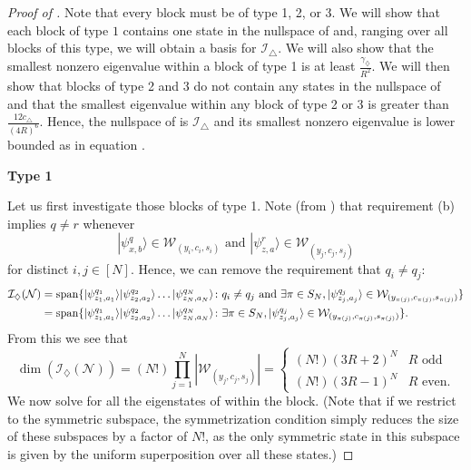 \documentclass[../thesis-main/thesis-main]{subfiles}
\begin{document}
\begin{proof}[Proof of \protect{}]
Note that every block must be of type 1, 2, or 3.  We will show that each block of type $1$ contains one state in the nullspace of  and, ranging over all blocks of this type, we will obtain a basis for $\mathcal{I}_{\triangle}$. We will also show that the smallest nonzero eigenvalue within a block of type 1 is at least $\frac{\gamma_{\diamondsuit}}{R^{2}}$.  We will then show that blocks of type 2 and 3 do not contain any states in the nullspace of  and that the smallest eigenvalue within any block of type 2 or 3 is greater than $\frac{12c_{\triangle}}{(4R)^6}$. Hence, the nullspace of  is $\mathcal{I}_{\triangle}$ and its smallest nonzero eigenvalue is lower bounded as in equation .

\smallskip
\noindent \textbf{Type 1}
\smallskip

\noindent Let us first investigate those blocks of type 1.  Note (from ) that requirement (b) implies $q\neq r$ whenever 
\begin{equation}
|\psi_{x,b}^{q}\rangle\in\mathcal{W}_{(y_{i},c_{i},s_{i})}\text{ and }|\psi_{z,a}^{r}\rangle\in\mathcal{W}_{(y_{j},c_{j},s_{j})}
\end{equation}
for distinct $i,j\in[N]$. Hence, we can remove the requirement that $q_i\neq q_j$:
\begin{align}
  \mathcal{\mathcal{I}_{\diamondsuit}}(\mathcal{N}) 
    & =\operatorname{span}\{ |\psi_{z_{1},a_{1}}^{q_{1}}\rangle|\psi_{z_{2},a_{2}}^{q_{2}}\rangle\ldots|\psi_{z_{N},a_{N}}^{q_{N}}\rangle\colon q_{i}\neq q_{j}\text{ and } \exists \pi \in S_N , |\psi_{z_{j},a_{j}}^{q_{j}}\rangle\in\mathcal{W}_{(y_{\pi(j)},c_{\pi(j)},s_{\pi(j)})}\} \\
   & =\operatorname{span}\{|\psi_{z_{1},a_{1}}^{q_{1}}\rangle|\psi_{z_{2},a_{2}}^{q_{2}}\rangle\ldots|\psi_{z_{N},a_{N}}^{q_{N}}\rangle\colon\exists \pi \in S_N ,|\psi_{z_{j},a_{j}}^{q_{j}}\rangle\in\mathcal{W}_{(y_{\pi(j)},c_{\pi(j)},s_{\pi(j)})}\}.
\end{align}
From this we see that 
\begin{equation}
\dim(\mathcal{I}_{\diamondsuit}(\mathcal{N}))
  =(N!)\prod_{j=1}^{N}\left|{\mathcal{W}_{(y_{j},c_{j},s_{j})}}\right|
  =\begin{cases}(
  N!)\left(3R+2\right)^{N} & R\text{ odd}\\
  (N!)\left(3R-1\right)^{N} & R\text{ even.}
\end{cases}
\end{equation}
We now solve for all the eigenstates of  within the block. (Note that if we restrict to the symmetric subspace, the symmetrization condition simply reduces the size of these subspaces by a factor of $N!$, as the only symmetric state in this subspace is given by the uniform superposition over all these states.)


\end{proof}
\end{document}
